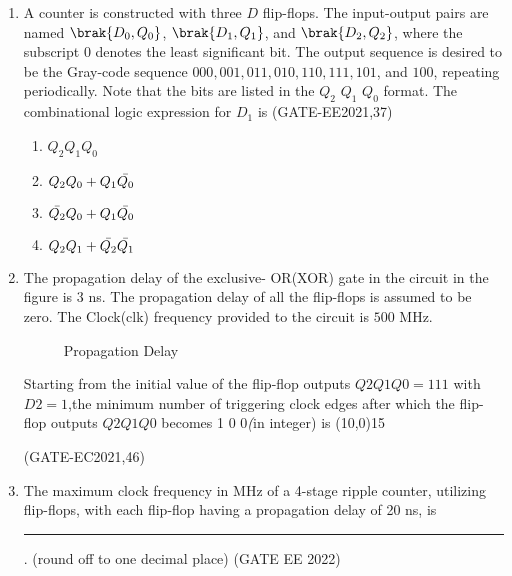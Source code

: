 \begin{enumerate}

\item A counter is constructed with three $D$ flip-flops. The input-output pairs are named $\brak{D_0, Q_0}$, $\brak{D_1, Q_1}$, and $\brak{D_2, Q_2}$, where the subscript $0$ denotes the least significant bit. The output sequence is desired to be the Gray-code sequence $000, 001, 011, 010, 110, 111, 101$, and $100$, repeating periodically. Note that the bits are listed in the $Q_2$  $Q_1$  $Q_0$ format. The combinational logic expression for $D_1$ is
\hfill(GATE-EE2021,37)

\begin{enumerate}
    \item $Q_2 Q_1 Q_0$
    \item $Q_2 Q_0 + Q_1 \Bar{Q_0}$
    \item $\Bar{Q_2} Q_0 + Q_1 \Bar{Q_0}$
    \item $Q_2 Q_1 + \Bar{Q_2} \Bar{Q_1}$
\end{enumerate}


\item The propagation delay of the exclusive- OR(XOR) gate in the circuit in the figure is $3$ ns. The propagation delay of all the flip-flops is assumed to be zero. The Clock(clk) frequency provided to the circuit is $500$ MHz.

	\begin{figure}[H]
    \centering
    
    \caption{Propagation Delay}
	\label{fig:PropagationDelay}
\end{figure}
Starting from the initial value of the flip-flop outputs $Q2Q1Q0 =1 1 1$ with $D2=1$,the minimum number of triggering clock edges after which the flip-flop outputs $Q2Q1Q0$ becomes 1 0 0\emph (in integer) is \line(10,0){15}

\hfill(GATE-EC2021,46)


\item The maximum clock frequency in MHz of a 4-stage ripple counter, utilizing flip-flops, with each flip-flop having a propagation delay of 20 ns, is \rule{1cm}{0.10mm}. (round off to one decimal place)
\label{gate-ee-2022-29}
\hfill (GATE EE 2022)


\end{enumerate}
